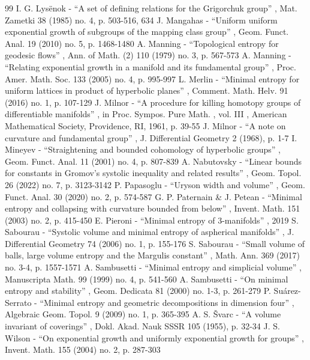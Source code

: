 \documentclass[10pt]{amsart}
\theoremstyle{definition}
\begin{document}
\begin{thebibliography}{99}
 I. G. Lysënok - “A set of defining relations for the Grigorchuk group” , Mat. Zametki 38 (1985) no. 4, p. 503-516, 634
 J. Mangahas - “Uniform uniform exponential growth of subgroups of the mapping class group” , Geom. Funct. Anal. 19 (2010) no. 5, p. 1468-1480
 A. Manning - “Topological entropy for geodesic flows” , Ann. of Math. (2) 110 (1979) no. 3, p. 567-573
 A. Manning - “Relating exponential growth in a manifold and its fundamental group” , Proc. Amer. Math. Soc. 133 (2005) no. 4, p. 995-997
 L. Merlin - “Minimal entropy for uniform lattices in product of hyperbolic planes” , Comment. Math. Helv. 91 (2016) no. 1, p. 107-129
 J. Milnor - “A procedure for killing homotopy groups of differentiable manifolds” , in Proc. Sympos. Pure Math. , vol. III , American Mathematical Society, Providence, RI, 1961, p. 39-55
 J. Milnor - “A note on curvature and fundamental group” , J. Differential Geometry 2 (1968), p. 1-7
 I. Mineyev - “Straightening and bounded cohomology of hyperbolic groups” , Geom. Funct. Anal. 11 (2001) no. 4, p. 807-839
 A. Nabutovsky - “Linear bounds for constants in Gromov’s systolic inequality and related results” , Geom. Topol. 26 (2022) no. 7, p. 3123-3142
 P. Papasoglu - “Uryson width and volume” , Geom. Funct. Anal. 30 (2020) no. 2, p. 574-587
 G. P. Paternain \& J. Petean - “Minimal entropy and collapsing with curvature bounded from below” , Invent. Math. 151 (2003) no. 2, p. 415-450
 E. Pieroni - “Minimal entropy of $3$-manifolds” , 2019
 S. Sabourau - “Systolic volume and minimal entropy of aspherical manifolds” , J. Differential Geometry 74 (2006) no. 1, p. 155-176
 S. Sabourau - “Small volume of balls, large volume entropy and the Margulis constant” , Math. Ann. 369 (2017) no. 3-4, p. 1557-1571
 A. Sambusetti - “Minimal entropy and simplicial volume” , Manuscripta Math. 99 (1999) no. 4, p. 541-560
 A. Sambusetti - “On minimal entropy and stability” , Geom. Dedicata 81 (2000) no. 1-3, p. 261-279
 P. Suárez-Serrato - “Minimal entropy and geometric decompositions in dimension four” , Algebraic Geom. Topol. 9 (2009) no. 1, p. 365-395
 A. S. Švarc - “A volume invariant of coverings” , Dokl. Akad. Nauk SSSR 105 (1955), p. 32-34
 J. S. Wilson - “On exponential growth and uniformly exponential growth for groups” , Invent. Math. 155 (2004) no. 2, p. 287-303
\end{thebibliography}
\end{document}
